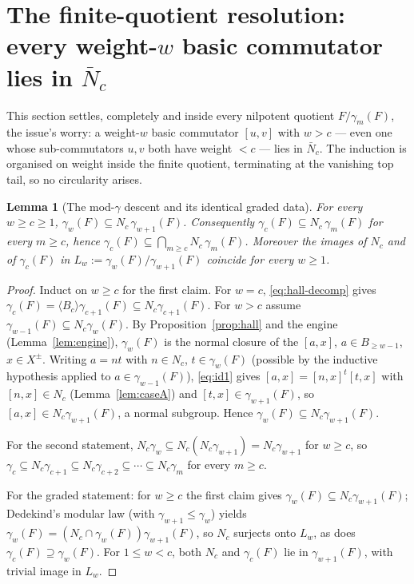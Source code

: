 \documentclass{amsart}
\newtheorem{lemma}{Lemma}
\theoremstyle{definition}
\theoremstyle{remark}
\begin{document}
\section{The finite-quotient resolution: every weight-$w$ basic commutator lies in
$\bar N_c$}\label{sec:finite}

This section settles, completely and inside every nilpotent quotient $F/\gamma_m(F)$,
the issue's worry: a weight-$w$ basic commutator $[u,v]$ with $w>c$ --- even one whose
sub-commutators $u,v$ both have weight $<c$ --- lies in $\bar N_c$. The induction is
organised on weight inside the finite quotient, terminating at the vanishing top tail,
so no circularity arises.

\begin{lemma}[The mod-$\gamma$ descent and its identical graded data]\label{lem:moddescent}
For every $w\ge c\ge1$, $\gamma_w(F)\subseteq N_c\,\gamma_{w+1}(F)$. Consequently
$\gamma_c(F)\subseteq N_c\,\gamma_m(F)$ for every $m\ge c$, hence
$\gamma_c(F)\subseteq\bigcap_{m\ge c}N_c\,\gamma_m(F)$. Moreover the images of $N_c$
and of $\gamma_c(F)$ in $L_w:=\gamma_w(F)/\gamma_{w+1}(F)$ coincide for every $w\ge1$.
\end{lemma}
\begin{proof}
Induct on $w\ge c$ for the first claim. For $w=c$, \eqref{eq:hall-decomp} gives
$\gamma_c(F)=\langle B_c\rangle\gamma_{c+1}(F)\subseteq N_c\gamma_{c+1}(F)$. For
$w>c$ assume $\gamma_{w-1}(F)\subseteq N_c\gamma_w(F)$. By
Proposition~\ref{prop:hall} and the engine (Lemma~\ref{lem:engine}), $\gamma_w(F)$
is the normal closure of the $[a,x]$, $a\in B_{\ge w-1}$, $x\in X^{\pm}$. Writing
$a=nt$ with $n\in N_c$, $t\in\gamma_w(F)$ (possible by the inductive hypothesis
applied to $a\in\gamma_{w-1}(F)$), \eqref{eq:id1} gives $[a,x]=[n,x]^t[t,x]$ with
$[n,x]\in N_c$ (Lemma~\ref{lem:caseA}) and $[t,x]\in\gamma_{w+1}(F)$, so
$[a,x]\in N_c\gamma_{w+1}(F)$, a normal subgroup. Hence
$\gamma_w(F)\subseteq N_c\gamma_{w+1}(F)$.

For the second statement, $N_c\gamma_w\subseteq N_c(N_c\gamma_{w+1})=N_c\gamma_{w+1}$
for $w\ge c$, so $\gamma_c\subseteq N_c\gamma_{c+1}\subseteq N_c\gamma_{c+2}\subseteq
\cdots\subseteq N_c\gamma_m$ for every $m\ge c$.

For the graded statement: for $w\ge c$ the first claim gives $\gamma_w(F)\subseteq
N_c\gamma_{w+1}(F)$; Dedekind's modular law (with $\gamma_{w+1}\le\gamma_w$) yields
$\gamma_w(F)=(N_c\cap\gamma_w(F))\gamma_{w+1}(F)$, so $N_c$ surjects onto $L_w$, as
does $\gamma_c(F)\supseteq\gamma_w(F)$. For $1\le w<c$, both $N_c$ and $\gamma_c(F)$
lie in $\gamma_{w+1}(F)$, with trivial image in $L_w$.
\end{proof}
\end{document}
